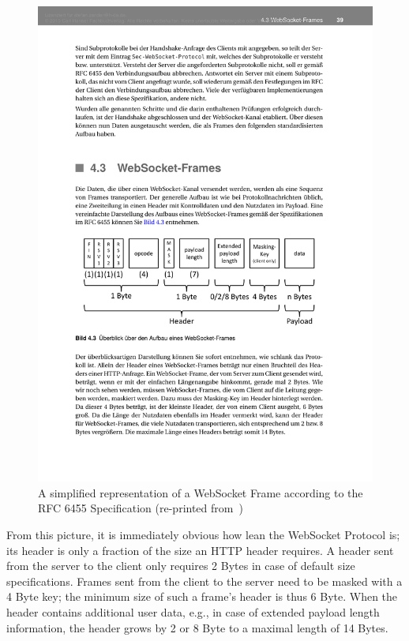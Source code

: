\documentclass[a4paper, justified, notoc]{tufte-handout} %
\begin{document}
\begin{figure}%
	\centering
  \includegraphics[width=1\textwidth]{./figures/websocket_frame_simple.pdf}
  \caption{A simplified representation of a WebSocket Frame according to the RFC 6455 Specification (re-printed from~\citep{gorski:2015})}
  \label{fig:frame_simple}
\end{figure}
From this picture, it is immediately obvious how lean the WebSocket Protocol is; its header is only a fraction of the size an HTTP header requires. A header sent from the server to the client only requires 2 Bytes in case of default size specifications. Frames sent from the client to the server need to be masked with a 4 Byte key; the minimum size of such a frame's header is thus 6 Byte. When the header contains additional user data, e.g., in case of extended payload length information, the header grows by 2 or 8 Byte to a maximal length of 14 Bytes.
\end{document}

